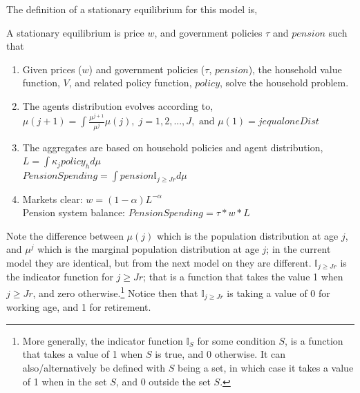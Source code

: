The definition of a stationary equilibrium for this model is,
\begin{definition}
 A stationary equilibrium is price $w$, and government policies $\tau$ and $pension$ such that
 \begin{enumerate}
  \item Given prices ($w$) and government policies ($\tau$, $pension$), the household value function, $V$, and related policy function, $policy$, solve the household problem.
  \item The agents distribution evolves according to,
   \\  $\mu(j+1)=\int \frac{\mu^{j+1}}{\mu^j} \mu(j), \; j=1,2,...,J,\text{ and }\mu(1)=jequaloneDist$
  \item The aggregates are based on household policies and agent distribution,
   \\ $L=\int \kappa_j policy_h d\mu$
   \\ $PensionSpending=\int pension \mathbb{I}_{j\geq Jr} d\mu$
  \item Markets clear: $w=(1-\alpha)L^{-\alpha}$
   \\ Pension system balance: $PensionSpending=\tau*w*L$
 \end{enumerate}
\end{definition}
\noindent Note the difference between $\mu(j)$ which is the population distribution at age $j$, and $\mu^j$ which is the marginal population distribution at age $j$; in the current model they are identical, but from the next model on they are different. $\mathbb{I}_{j\geq Jr}$ is the indicator function for $j\geq Jr$; that is a function that takes the value 1 when $j\geq Jr$, and zero otherwise.\footnote{More generally, the indicator function $\mathbb{I}_S$ for some condition $S$, is a function that takes a value of 1 when $S$ is true, and $0$ otherwise. It can also/alternatively be defined with $S$ being a set, in which case it takes a value of 1 when in the set $S$, and $0$ outside the set $S$.} Notice then that $\mathbb{I}_{j\geq Jr}$ is taking a value of 0 for working age, and 1 for retirement.


